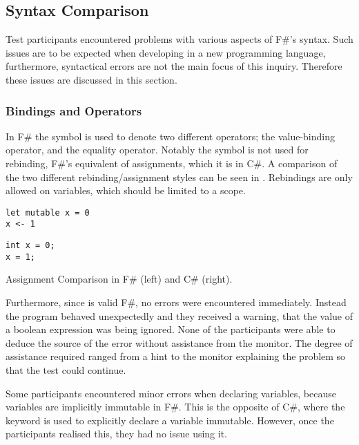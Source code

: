 \subsection{Syntax Comparison}\label{sec:syntax}
Test participants encountered problems with various aspects of F\#'s syntax. Such issues are to be expected when developing in a new programming language, furthermore, syntactical errors are not the main focus of this inquiry. Therefore these issues are discussed in this section.

\subsubsection{Bindings and Operators}
In F\# the \ttt{=} symbol is used to denote two different operators; the value-binding operator, and the equality operator. Notably the symbol is not used for rebinding, F\#'s equivalent of assignments, which it is in C\#. A comparison of the two different rebinding/assignment styles can be seen in . Rebindings are only allowed on  variables, which should be limited to a scope.

\begin{listing}[H]
\begin{minipage}{.45\textwidth}
\begin{verbatim}
let mutable x = 0
x <- 1
\end{verbatim}
\end{minipage}
\hfill
\begin{minipage}{.45\textwidth}
\begin{verbatim}
int x = 0;
x = 1;
\end{verbatim}
\end{minipage}
\caption{Assignment Comparison in F\# (left) and C\# (right).}
\label{lst:ass-comp}
\end{listing}

Furthermore, since  is valid F\#, no errors were encountered immediately. Instead the program behaved unexpectedly and they received a warning, that the value of a boolean expression was being ignored. None of the participants were able to deduce the source of the error without assistance from the monitor. The degree of assistance required ranged from a hint to the monitor explaining the problem so that the test could continue.

Some participants encountered minor errors when declaring variables, because variables are implicitly immutable in F\#. This is the opposite of C\#, where the  keyword is used to explicitly declare a variable immutable. However, once the participants realised this, they had no issue using it.


